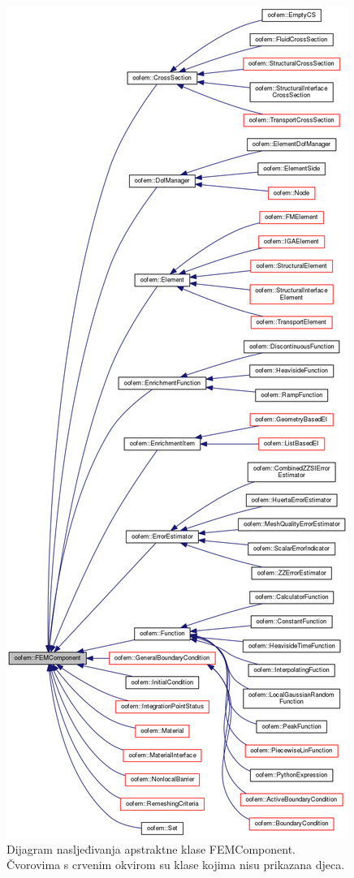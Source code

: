 \documentclass[a4paper,twoside,12pt]{memoir} %
\begin{document}
\begin{figure}[h!t]
\begin{center}
\includegraphics[scale=0.26]{pictures/chapter_oofem/FEMComponent_inheritance.png}
\caption{Dijagram nasljeđivanja apstraktne klase FEMComponent. Čvorovima s crvenim okvirom su klase kojima nisu prikazana djeca. \cite{oofem_reference}}
\label{fig:FEMComponent_inheritance}
\end{center}
\end{figure}
\end{document}
